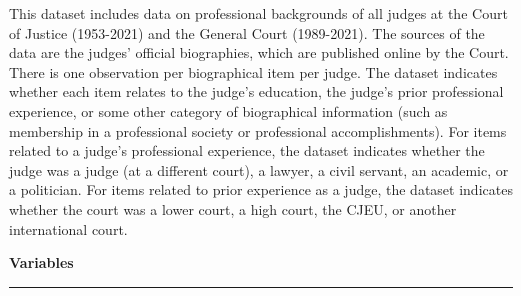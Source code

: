 \documentclass[10pt]{article}
\newcommand{\dividerline}{{\color{gray!10} \rule[4pt] {\textwidth}{3pt}}}
\newcommand{\subheading}[1]{
\vspace{24pt}
{\color{themecolor} \fontsize{14}{14}\selectfont \textbf{#1}}
\vspace{6pt}
\dividerline
\vspace{-20pt}
}
\begin{document}
\begin{flushleft}
This dataset includes data on professional backgrounds of all judges at the Court of Justice (1953-2021) and the General Court (1989-2021). The sources of the data are the judges' official biographies, which are published online by the Court. There is one observation per biographical item per judge. The dataset indicates whether each item relates to the judge's education, the judge's prior professional experience, or some other category of biographical information (such as membership in a professional society or professional accomplishments). For items related to a judge's professional experience, the dataset indicates whether the judge was a judge (at a different court), a lawyer, a civil servant, an academic, or a politician. For items related to prior experience as a judge, the dataset indicates whether the court was a lower court, a high court, the CJEU, or another international court.

\subheading{Variables}


\end{flushleft}
\end{document}
